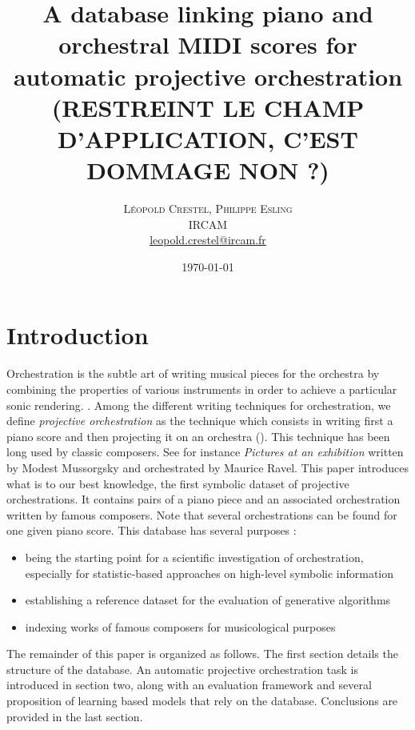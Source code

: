 \documentclass[twoside,twocolumn]{article}
\title{A database linking piano and orchestral MIDI scores for automatic projective orchestration \textbf{(RESTREINT LE CHAMP D'APPLICATION, C'EST DOMMAGE NON ?)}} %
\author{%
\textsc{L\'eopold Crestel, Philippe Esling}\\[1ex] %
\normalsize IRCAM \\ %
\normalsize \href{mailto:leopold.crestel@ircam.fr}{leopold.crestel@ircam.fr} %
}
\date{\today} %
\begin{document}
\maketitle


\section{Introduction}
Orchestration is the subtle art of writing musical pieces for the orchestra by combining the properties of various instruments in order to achieve a particular sonic rendering. \cite{koechli_orch,Rimsky-Korsakov:1873aa}. 
Among the different writing techniques for orchestration, we define \textit{projective orchestration} as the technique which consists in writing first a piano score and then projecting it on an orchestra (). This technique has been long used by classic composers.
See for instance \textit{Pictures at an exhibition} written by Modest Mussorgsky and orchestrated by Maurice Ravel.
This paper introduces what is to our best knowledge, the first symbolic dataset of projective orchestrations.
It contains pairs of a piano piece and an associated orchestration written by famous composers. Note that several orchestrations can be found for one given piano score.
This database has several purposes :
\begin{itemize}
	\item being the starting point for a scientific investigation of orchestration, especially for statistic-based approaches on high-level symbolic information
	\item establishing a reference dataset for the evaluation of generative algorithms 
	\item indexing works of famous composers for musicological purposes
\end{itemize}

The remainder of this paper is organized as follows. The first section details the structure of the database. An automatic projective orchestration task is introduced in section two, along with an evaluation framework and several proposition of learning based models that rely on the database.  Conclusions are provided in the last section.
\end{document}
